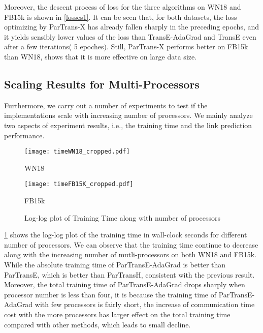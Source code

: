 \documentclass[sigconf]{acmart}
\begin{document}
Moreover, the descent process of loss for the three algorithms on WN18  and  FB15k is shown in \figurename \ref{losses1}.  It can be seen that, for both datasets, the loss optimizing by ParTrans-X has already  fallen sharply  in the preceding epochs, and it yields sensibly lower values of the loss than TransE-AdaGrad and TransE even after a few iterations( 5 epoches). 
 Still, ParTrans-X performs better on FB15k than WN18, shows that it is more effective on large data size.





\subsection{Scaling Results for Multi-Processors}




Furthermore, we carry out a number of experiments to test if the implementations scale with increasing number of processors. We mainly analyze two aspects of experiment results, i.e., the training time and the link prediction performance. 




\begin{figure}[htbp]
\begin{minipage}[t]{0.45\linewidth}
\centering
\texttt{[image: timeWN18\_cropped.pdf]}
\vspace{-15pt}
\caption*{WN18}
\end{minipage}
\begin{minipage}[t]{0.45\linewidth}
\centering
\texttt{[image: timeFB15K\_cropped.pdf]}
\vspace{-15pt}
\caption*{FB15k}
\end{minipage}
\vspace{-7pt}
\caption{Log-log plot of Training Time along with number of processors}
\label{traintime}
\vspace{-10pt}
\end{figure}

\figurename \ref{traintime}  shows the log-log plot of the training time in wall-clock seconds for different number of processors. We can observe that the training time continue to decrease along with the increasing number of mutli-processors on both WN18 and FB15k. While the absolute training time of ParTransE-AdaGrad is better than ParTransE, which is better than ParTransH, consistent with the previous result. Moreover, the total training time of ParTransE-AdaGrad drops sharply when processor number is less than four, it is because the training time of ParTransE-AdaGrad with few processors is fairly short, the increase of communication time cost  with the more processors has larger effect on the total training time compared with other methods,  which leads to small decline. 
\end{document}
